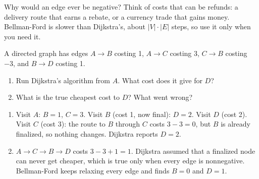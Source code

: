 Why would an edge ever be negative? Think of costs that can be refunds: a
delivery route that earns a rebate, or a currency trade that gains money.
Bellman-Ford is slower than Dijkstra's, about $|V| \cdot |E|$ steps, so use
it only when you need it.

\begin{Exercise}[title={When Dijkstra Fails}, label={ex:bellman}]
A directed graph has edges $A \to B$ costing 1, $A \to C$ costing 3,
$C \to B$ costing $-3$, and $B \to D$ costing 1.
\begin{enumerate}
\item Run Dijkstra's algorithm from $A$. What cost does it give for $D$?
\item What is the true cheapest cost to $D$? What went wrong?
\end{enumerate}
\end{Exercise}
\begin{Answer}[ref={ex:bellman}]
\begin{enumerate}
\item Visit $A$: $B = 1$, $C = 3$. Visit $B$ (cost 1, now final): $D = 2$.
Visit $D$ (cost 2). Visit $C$ (cost 3): the route to $B$ through $C$ costs
$3 - 3 = 0$, but $B$ is already finalized, so nothing changes. Dijkstra
reports $D = 2$.
\item $A \to C \to B \to D$ costs $3 - 3 + 1 = 1$. Dijkstra assumed that a
finalized node can never get cheaper, which is true only when every edge
is nonnegative. Bellman-Ford keeps relaxing every edge and finds $B = 0$
and $D = 1$.
\end{enumerate}
\end{Answer}
